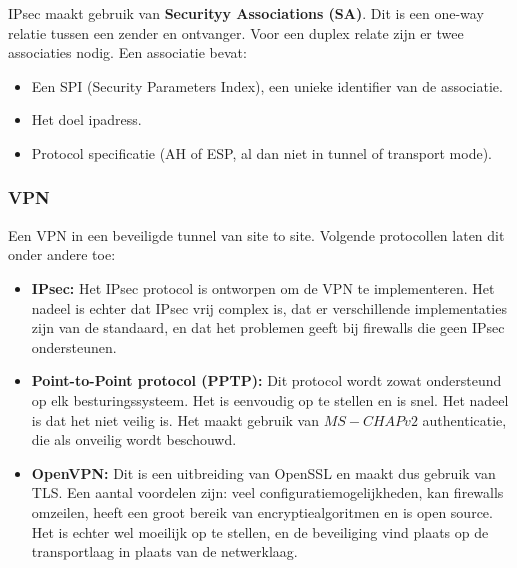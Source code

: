\documentclass{report}
\begin{document}
	IPsec maakt gebruik van \textbf{Securityy Associations (SA)}. Dit is een one-way relatie tussen een zender en ontvanger. Voor een duplex relate zijn er twee associaties nodig. Een associatie bevat: 
	\begin{itemize}
		\item[\info] Een SPI (Security Parameters Index), een unieke identifier van de associatie.
		\item[\info] Het doel ipadress.
		\item[\info] Protocol specificatie (AH of ESP, al dan niet in tunnel of transport mode).
	\end{itemize}

	\subsubsection{VPN}
	Een VPN in een beveiligde tunnel van site to site. Volgende protocollen laten dit onder andere toe: 
	\begin{itemize}
		\item[\info] \textbf{IPsec:} Het IPsec protocol is ontworpen om de VPN te implementeren. Het nadeel is echter dat IPsec vrij complex is, dat er verschillende implementaties zijn van de standaard, en dat het problemen geeft bij firewalls die geen IPsec ondersteunen.
		\item[\info] \textbf{Point-to-Point protocol (PPTP):} Dit protocol wordt zowat ondersteund op elk besturingssysteem. Het is eenvoudig op te stellen en is snel. Het nadeel is dat het niet veilig is. Het maakt gebruik van $MS-CHAPv2$ authenticatie, die als onveilig wordt beschouwd. 
		\item[\info] \textbf{OpenVPN:} Dit is een uitbreiding van OpenSSL en maakt dus gebruik van TLS. Een aantal voordelen zijn: veel configuratiemogelijkheden, kan firewalls omzeilen, heeft een groot bereik van encryptiealgoritmen en is open source. Het is echter wel moeilijk op te stellen, en de beveiliging vind plaats op de transportlaag in plaats van de netwerklaag.
	\end{itemize}
\end{document}
